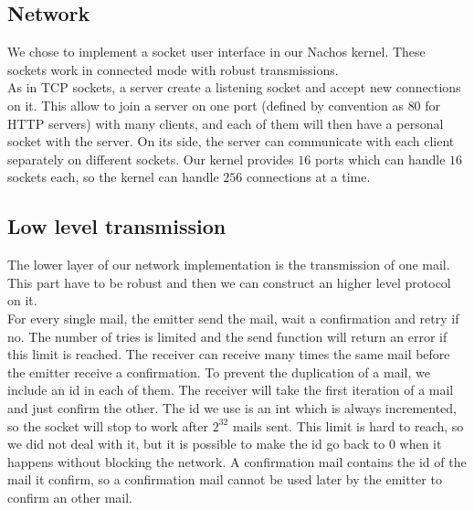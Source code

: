 \subsection{Network}
We chose to implement a socket user interface in our Nachos kernel. These
sockets work in connected mode with robust transmissions.\\
As in TCP sockets, a server create a listening socket and accept new
connections on it. This allow to join a server on one port (defined by
convention as $80$ for HTTP servers) with many clients, and each of them will then
have a personal socket with the server.
On its side, the server can communicate with each client separately on
different sockets. Our kernel provides $16$ ports which can handle $16$ sockets
each, so the kernel can handle $256$ connections at a time.

\subsection{Low level transmission}
The lower layer of our network implementation is the transmission of one mail.
This part have to be robust and then we can construct an higher level protocol
on it.\\
For every single mail, the emitter send the mail, wait a confirmation and retry
if no. The number of tries is limited and the send function will return an
error if this limit is reached.
The receiver can receive many times the same mail before the emitter receive a
confirmation. To prevent the duplication of a mail, we include an id in each of
them. The receiver will take the first iteration of a mail and just confirm the
other. The id we use is an int which is always incremented, so the socket will stop
to work after $2^{32}$ mails sent. This limit is hard to reach, so we did not
deal with it, but it is possible to make the id go back to $0$ when it happens
without blocking the network.
A confirmation mail contains the id of the mail it confirm, so a confirmation
mail cannot be used later by the emitter to confirm an other mail.

